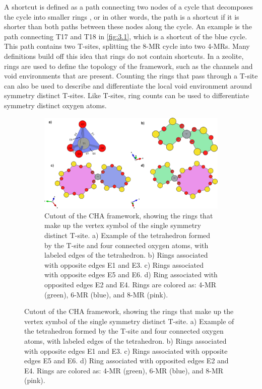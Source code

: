 \documentclass[preprint,numrefs,noinfo,sort&compress]{elsarticle}
\begin{document}
A shortcut is defined as a path connecting two nodes of a cycle that decomposes the cycle into smaller rings \cite{guttman-ring-1990,goetzke-properties-1991}, or in other words, the path is a shortcut if it is shorter than both paths between these nodes along the cycle. An example is the path connecting T17 and T18 in \cref{fig:3.1}, which is a shortcut of the blue cycle. This path contains two T-sites, splitting the 8-MR cycle into two 4-MRs. Many definitions build off this idea that rings do not contain shortcuts. In a zeolite, rings are used to define the topology of the framework, such as the channels and void environments that are present. Counting the rings that pass through a T-site can also be used to describe and differentiate the local void environment around symmetry distinct T-sites. Like T-sites, ring counts can be used to differentiate symmetry distinct oxygen atoms.

\begin{figure}
\begin{figure}[H]
\centering
\includegraphics[width=\textwidth]{figures/chapter-3/cha-vertex.pdf}
\caption{Cutout of the CHA framework, showing the rings that make up the vertex symbol of the single symmetry distinct T-site. a) Example of the tetrahedron formed by the T-site and four connected oxygen atoms, with labeled edges of the tetrahedron. b) Rings associated with opposite edges E1 and E3. c) Rings associated with opposite edges E5 and E6. d) Ring associated with opposited edges E2 and E4. Rings are colored as: 4-MR (green), 6-MR (blue), and 8-MR (pink). \label{fig:cha-vertex}}
\end{figure}
\end{figure}
\end{document}
